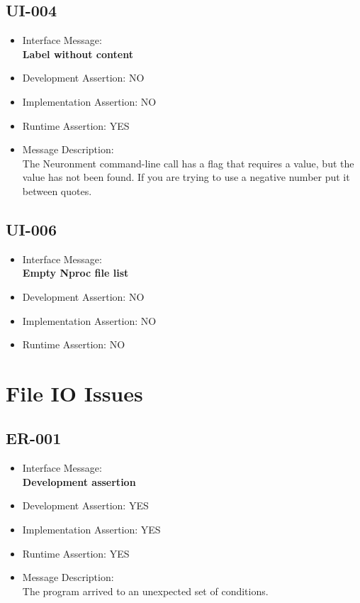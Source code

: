 \subsection{UI-004}
\begin{itemize}
  \item Interface Message:\\[1em]
    \textbf{Label without content}
  \item Development Assertion: NO
  \item Implementation Assertion: NO
  \item Runtime Assertion: YES
  \item Message Description:\\[1em]
    The Neuronment command-line call has a flag that requires a value, but the value has not been found. If you are trying to use a negative number put it between quotes.
\end{itemize}

\subsection{UI-006}
\begin{itemize}
  \item Interface Message:\\[1em]
    \textbf{Empty Nproc file list}
  \item Development Assertion: NO
  \item Implementation Assertion: NO
  \item Runtime Assertion: NO
\end{itemize}

\section{File IO Issues}

\subsection{ER-001}
\begin{itemize}
  \item Interface Message:\\[1em]
    \textbf{Development assertion}
  \item Development Assertion: YES
  \item Implementation Assertion: YES
  \item Runtime Assertion: YES
  \item Message Description:\\[1em]
    The program arrived to an unexpected set of conditions.
\end{itemize}


